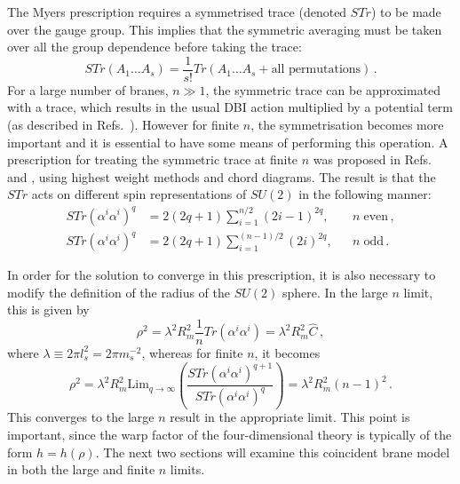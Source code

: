 The Myers prescription requires a symmetrised trace (denoted $STr$) to 
be made over the gauge group. This implies that 
the symmetric averaging must be taken over all the group dependence 
before taking the trace:
% 
\begin{equation}
 \label{eq:str-defn-multi}
 STr (A_1 \ldots A_s) = \frac{1}{s!} Tr(A_1 \ldots A_s + \text{all
permutations})\,.
\end{equation}
% 
For a large number of branes, $n \gg 1$, the symmetric trace can be
approximated with a trace, 
which results in the usual DBI action multiplied by a potential term (as
described in Refs.~\cite{thomasward, Kachru:2002gs}). 
However for finite $n$, the symmetrisation becomes more important and it
is essential to have some means of performing this operation. A prescription for
treating the symmetric trace at finite $n$ was proposed
in Refs.~\cite{Ramgoolam:2004gw} and \cite{McNamara:2005ry}, 
using highest weight methods and chord diagrams. 
% 
The result is that the $STr$ acts on different spin representations of $SU(2)$ 
in the following manner:
% 
\begin{align}
\label{eq:str-even-multi}
STr (\alpha^i \alpha^i)^q &= 2(2q+1)\sum_{i=1}^{n/2}(2i-1)^{2q} , 
&& n\; \mathrm{ even}\,, 
\\
\label{eq:str-odd-multi}
STr (\alpha^i \alpha^i)^q &= 2(2q+1)\sum_{i=1}^{(n-1)/2} (2i)^{2q} , 
&& n\; \mathrm{ odd}\,.
\end{align}
% 


In order for the solution to converge in this prescription, 
it is also necessary to modify the definition of the radius of the 
$SU(2)$ sphere. In the large $n$ limit, this is given by
% 
\begin{equation}
\label{eq:largen-rho-multi}
\rho^2 = \lambda^2 R_m^2 \frac{1}{n} Tr(\alpha^i \alpha^i) = \lambda^2 R_m^2
\hat{C} \,,
\end{equation}
% 
where $\lambda \equiv 2\pi l_s^2 = 2\pi m_s^{-2}$, 
whereas for finite $n$, it becomes
% 
\begin{equation}
\label{eq:finiten-rho-multi}
\rho^2 = \lambda^2 R_m^2 \mathrm{Lim}_{q \to \infty} \left(\frac{STr (\alpha^i
\alpha^i)^{q+1}}{STr(\alpha^i \alpha^i)^q} \right) 
= \lambda^2 R_m^2 (n-1)^2 \,.
\end{equation}
% 
This converges to the large $n$ result in the appropriate limit.
This point is important, since the warp factor 
of the four-dimensional theory is typically of the form $h= h(\rho)$.
% 
The next two sections will examine this coincident brane model in both the
large and finite $n$ limits. 

